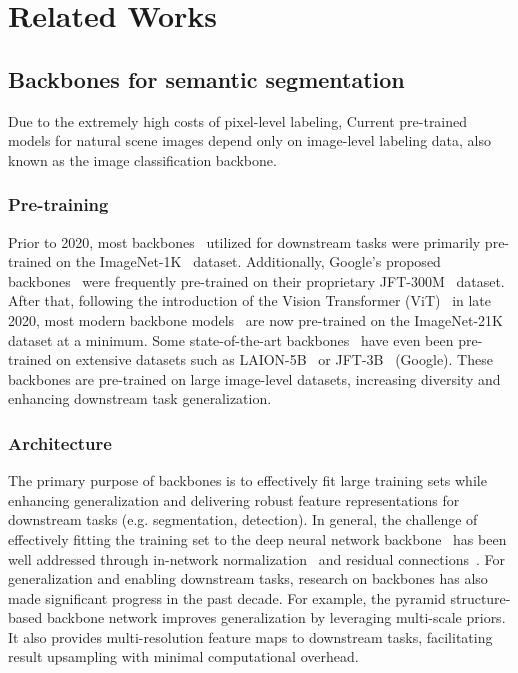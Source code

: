 \section{Related Works}
\label{sec:HFGD:related_work}
\label{sec:UpViT:related_work}

\subsection{Backbones for semantic segmentation}

Due to the extremely high costs of pixel-level labeling, Current pre-trained models for natural scene images depend only on image-level labeling data, also known as the image classification backbone.

\subsubsection{Pre-training}
Prior to 2020, most backbones~\cite{cAlexNet,cVGG,cResnet,cXception,cEfficientNet,cResnest} utilized for downstream tasks were primarily pre-trained on the ImageNet-1K~\cite{cImageNet-1K} dataset. 
Additionally, Google's proposed backbones~\cite{cEfficientNet} were frequently pre-trained on their proprietary JFT-300M~\cite{cJFT-300M} dataset.
%
After that, following the introduction of the Vision Transformer (ViT)~\cite{cViT} in late 2020, most modern backbone models~\cite{cViT,cSwin,cCPvT,cConvNeXT,cConvNeXtV2} are now pre-trained on the ImageNet-21K dataset at a minimum. 
Some state-of-the-art backbones~\cite{cEVA,cBEiT,cAugReg} have even been pre-trained on extensive datasets such as LAION-5B~\cite{cLAION-5B} or JFT-3B~\cite{cJFT-3B} (Google).
%
These backbones are pre-trained on large image-level datasets, increasing diversity and enhancing downstream task generalization.

\subsubsection{Architecture}
The primary purpose of backbones is to effectively fit large training sets while enhancing generalization and delivering robust feature representations for downstream tasks (e.g. segmentation, detection).
%
In general, the challenge of effectively fitting the training set to the deep neural network backbone~\cite{cResnet,cEfficientNet,cViT} has been well addressed through in-network normalization~\cite{cBatchNorm,cLayerNorm,cGroupNorm} and residual connections~\cite{cResnet}.
%
For generalization and enabling downstream tasks, research on backbones has also made significant progress in the past decade.
%
For example, the pyramid structure-based backbone network improves generalization by leveraging multi-scale priors. 
It also provides multi-resolution feature maps to downstream tasks, facilitating result upsampling with minimal computational overhead.


